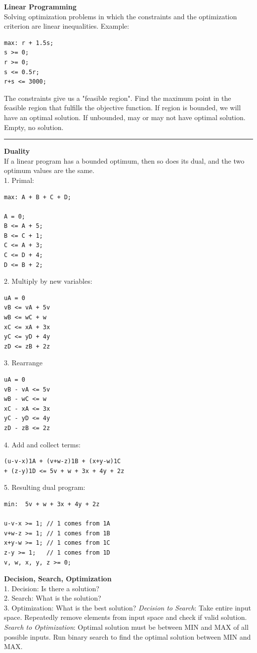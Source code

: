\documentclass[9pt]{amsart}
\begin{document}
\begin{multicols*}{3}
  \textbf{Linear Programming} \\
  Solving optimization problems in which the constraints and the optimization criterion are linear inequalities. Example:
  \begin{lstlisting}
max: r + 1.5s;
s >= 0;
r >= 0;
s <= 0.5r;
r+s <= 3000;
  \end{lstlisting}

  The constraints give us a "feasible region". Find the maximum point in the feasible region that fulfills the objective function. If region is bounded, we will have an optimal solution. If unbounded, may or may not have optimal solution. Empty, no solution.

  \vskip 7pt
  \hrule
  \vskip 7pt

  \textbf{Duality} \\
  If a linear program has a bounded optimum, then so does its dual, and the two optimum values are the same. \\
  1. Primal:
  \begin{lstlisting}
max: A + B + C + D;

A = 0;
B <= A + 5;
B <= C + 1;
C <= A + 3;
C <= D + 4;
D <= B + 2; 
  \end{lstlisting}
  2. Multiply by new variables:
  \begin{lstlisting}
uA = 0
vB <= vA + 5v
wB <= wC + w
xC <= xA + 3x
yC <= yD + 4y
zD <= zB + 2z
  \end{lstlisting}
  3. Rearrange
  \begin{lstlisting}
uA = 0
vB - vA <= 5v
wB - wC <= w
xC - xA <= 3x
yC - yD <= 4y
zD - zB <= 2z
  \end{lstlisting}
  4. Add and collect terms:
  \begin{lstlisting}
(u-v-x)1A + (v+w-z)1B + (x+y-w)1C 
+ (z-y)1D <= 5v + w + 3x + 4y + 2z
  \end{lstlisting}
  5. Resulting dual program:
  \begin{lstlisting}
min:  5v + w + 3x + 4y + 2z

u-v-x >= 1; // 1 comes from 1A
v+w-z >= 1; // 1 comes from 1B
x+y-w >= 1; // 1 comes from 1C
z-y >= 1;   // 1 comes from 1D
v, w, x, y, z >= 0; 
  \end{lstlisting}

  \textbf{Decision, Search, Optimization} \\
  1. Decision: Is there a solution? \\
  2. Search: What is the solution? \\
  3. Optimization: What is the best solution?
  \vskip 1pt
  \textit{Decision to Search}: Take entire input space. Repeatedly remove elements from input space and check if valid solution. \\
  \textit{Search to Optimization}: Optimal solution must be between MIN and MAX of all possible inputs. Run binary search to find the optimal solution between MIN and MAX.


\end{multicols*}
\end{document}
